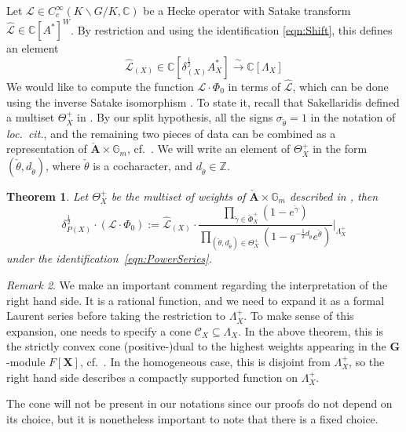 \documentclass{amsart}
\newtheorem{theorem}{Theorem}[section]
\theoremstyle{definition}
\theoremstyle{remark}
\newtheorem{remark}[theorem]{Remark}
\newcommand{\1}{\mathbf{1}}
\newcommand{\C}{\mathbb{C}}
\newcommand{\G}{\mathbf{G}}
\newcommand{\iso}{\xrightarrow{\,\sim\,}}
\newcommand{\mb}[1]{\mathbf{#1}}
\newcommand{\sh}[1]{\mathcal{#1}}
\newcommand{\Z}{\mathbb{Z}}
\theoremstyle{definition}
\renewcommand{\G}{\mathbb{G}}
\newcommand{\bG}{\mathbf{G}}
\begin{document}
Let $\sh{L}\in C_c^\infty(K\backslash G/K,\C)$ be a Hecke operator with Satake transform $\hat{\sh{L}}\in\C[A^*]^W$. By restriction and using the identification \eqref{eqn:Shift}, this defines an element
\begin{equation}\label{eqn:ShiftedHecke}
    \hat{\sh{L}}_{(X)}\in\C[\delta_{(X)}^{\frac{1}{2}}A_X^*]\iso\C[\Lambda_X]
\end{equation}
We would like to compute the function $\sh{L}\cdot\Phi_0$ in terms of $\hat{\sh{L}}$, which can be done using the inverse Satake isomorphism \cite{SakInvSatake}. To state it, recall that Sakellaridis defined a multiset $\Theta_X^+$ in \cite[\S 7.1]{SakSpherical}. By our split hypothesis, all the signs $\sigma_{\check\theta}=1$ in the notation of \emph{loc.~cit.}, and the remaining two pieces of data can be combined as a representation of $\check{\mb{A}}\times\G_m$, cf.\ \cite[\S 9.3.5]{BZSV}. We will write an element of $\Theta_X^+$ in the form $(\check{\theta},d_{\check{\theta}})$, where $\check{\theta}$ is a cocharacter, and $d_{\check{\theta}}\in\Z$. 
\begin{theorem}\label{thm:InverseSatake}
    Let $\Theta_X^+$ be the multiset of weights of $\check{\mb{A}}\times\G_m$ described in \cite[\S 7.1]{SakSpherical}, then
    \[
        \delta_{P(X)}^{\frac{1}{2}}\cdot(\sh{L}\cdot\Phi_0):=\hat{\sh{L}}_{(X)}\cdot\frac{\prod_{\check{\gamma}\in\check{\Phi}_X^+}(1-e^{\check{\gamma}})}{\prod_{(\check{\theta},d_{\check\theta})\in\Theta_X^+}(1-q^{-\frac{1}{2}d_{\check{\theta}}}e^{\check{\theta}})}\bigg|_{\Lambda_X^+}
    \]
    under the identification~\eqref{eqn:PowerSeries}.
\end{theorem}

\begin{remark}\label{rmk:Cone}
  We make an important comment regarding the interpretation of the right hand side. It is a rational function, and we need to expand it as a formal Laurent series before taking the restriction to $\Lambda_X^+$. To make sense of this expansion, one needs to specify a cone $\sh{C}_X\subseteq\Lambda_X$. In the above theorem, this is the strictly convex cone (positive-)dual to the highest weights appearing in the $\bG$-module $F[\mathbf{X}]$, cf.~\cite[\S 6]{SakInvSatake}. In the homogeneous case, this is disjoint from $\Lambda_X^+$, so the right hand side describes a compactly supported function on $\Lambda_X^+$.
  
  The cone will not be present in our notations since our proofs do not depend on its choice, but it is nonetheless important to note that there is a fixed choice.
\end{remark}
\end{document}
